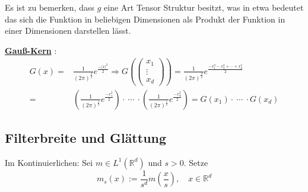 \documentclass{article}
\theoremstyle{plain}
\theoremstyle{definition}
\numberwithin{equation}{section}
\newcommand{\abs}[1] {
\left| #1 \right|
}
\newcommand{\R}[0] {
\mathbb R
}
\newcommand{\srmatrix}[1] {
\left( \begin{smallmatrix} #1 \end{smallmatrix} \right)
}
\newcommand{\mim}[1] {
\underline{\textbf{#1\index{#1}}}
}
\begin{document}
    Es ist zu bemerken, dass $g$ eine Art Tensor Struktur besitzt, was in etwa bedeutet das sich die Funktion in beliebigen Dimensionen als Produkt der Funktion in einer Dimensionen darstellen lässt.

    \mim{Gauß-Kern}:
    \begin{align*}
        G(x) =& \frac{1}{(2 \pi)^{\frac{d}{2}}} e^{\frac{-\abs{x}^2}{2}} \Rightarrow G\left( \srmatrix{x_1\\\vdots\\x_d} \right) = \frac{1}{(2 \pi)^{\frac{d}{2}}} e^{\frac{-x_1^2-x_2^2 + \cdots + x_d^2}{2}}\\
        =& \left( \frac{1}{(2 \pi)^\frac{1}{2}} e^{\frac{-x_1^2}{2}}\right) \cdot \ \cdots \ \cdot \left( \frac{1}{(2 \pi)^\frac{1}{2}} e^{\frac{-x_d^2}{2}}\right) = G(x_1) \cdot \ \cdots \ \cdot G(x_d)
    \end{align*}

    \subsection{Filterbreite und Glättung}

    \begin{center}
    \end{center}

    Im Kontinuierlichen: Sei $m \in L^1(\R^d)$ und $s > 0$.
    Setze 
        $$ m_s(x) := \frac{1}{s^d} m (\frac{x}{s}), \quad x\in \R^d$$
    
\end{document}
